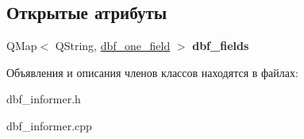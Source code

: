 \subsection*{Открытые атрибуты}
\begin{DoxyCompactItemize}
\item 
\hypertarget{classdbf__informer_abe97d4f6879c2b8e7c2e961a691c2088}{\-Q\-Map$<$ \-Q\-String, \hyperlink{structdbf__informer_1_1dbf__one__field}{dbf\-\_\-one\-\_\-field} $>$ {\bfseries dbf\-\_\-fields}}\label{classdbf__informer_abe97d4f6879c2b8e7c2e961a691c2088}

\end{DoxyCompactItemize}


Объявления и описания членов классов находятся в файлах\-:\begin{DoxyCompactItemize}
\item 
dbf\-\_\-informer.\-h\item 
dbf\-\_\-informer.\-cpp\end{DoxyCompactItemize}
